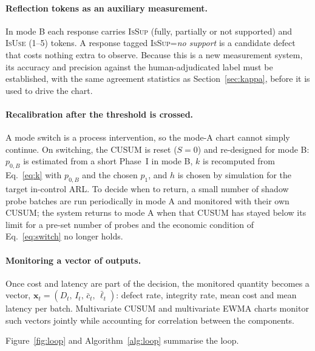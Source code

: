 \documentclass[11pt]{article}
\newcommand{\tok}[1]{\textsc{#1}}
\begin{document}
\paragraph{Reflection tokens as an auxiliary measurement.} In mode B each response carries \tok{IsSup} (fully, partially or not supported) and \tok{IsUse} (1--5) tokens. A response tagged \tok{IsSup}=\textit{no support} is a candidate defect that costs nothing extra to observe. Because this is a new measurement system, its accuracy and precision against the human-adjudicated label must be established, with the same agreement statistics as Section~\ref{sec:kappa}, before it is used to drive the chart.

\paragraph{Recalibration after the threshold is crossed.} A mode switch is a process intervention, so the mode-A chart cannot simply continue. On switching, the CUSUM is reset ($S=0$) and re-designed for mode B: $p_{0,B}$ is estimated from a short Phase~I in mode B, $k$ is recomputed from Eq.~\ref{eq:k} with $p_{0,B}$ and the chosen $p_1$, and $h$ is chosen by simulation for the target in-control ARL. To decide when to return, a small number of shadow probe batches are run periodically in mode A and monitored with their own CUSUM; the system returns to mode A when that CUSUM has stayed below its limit for a pre-set number of probes and the economic condition of Eq.~\ref{eq:switch} no longer holds.

\paragraph{Monitoring a vector of outputs.} Once cost and latency are part of the decision, the monitored quantity becomes a vector, $\mathbf{x}_t=(D_t,\,I_t,\,\bar c_t,\,\bar\ell_t)$: defect rate, integrity rate, mean cost and mean latency per batch. Multivariate CUSUM \citep{crosier1988} and multivariate EWMA \citep{lowry1992} charts monitor such vectors jointly while accounting for correlation between the components.

Figure~\ref{fig:loop} and Algorithm~\ref{alg:loop} summarise the loop.
\end{document}
